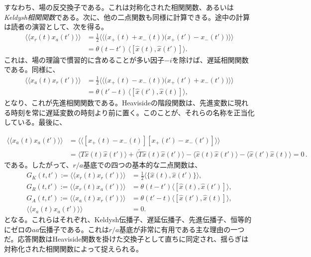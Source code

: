 \documentclass[a4paper,11pt,oneside]{article}
\theoremstyle{definition}
\numberwithin{equation}{section}
\newcommand{\ex}[1]{\langle #1 \rangle}
\newcommand{\expi}[1]{\langle \! \langle #1 \rangle \! \rangle}
\begin{document}
すなわち、場の反交換子である。これは対称化された相関関数、あるいは\textit{Keldysh相関関数}である。次に、他の二点関数も同様に計算できる。途中の計算は読者の演習として、次を得る。
\begin{align}
\langle\!\langle x_r(t)x_a(t')\rangle\!\rangle
&=
\frac12
\langle\!\langle
\bigl(x_+(t)+x_-(t)\bigr)
\bigl(x_+(t')-x_-(t')\bigr)
\rangle\!\rangle
\nonumber\\
&=
\theta(t-t')\,\langle [\hat x(t),\hat x(t')]\rangle .
\end{align}
これは、場の理論で慣習的に含めることが多い因子$-i$を除けば、遅延相関関数である。同様に、
\begin{align}
\langle\!\langle x_a(t)x_r(t')\rangle\!\rangle
&=
\frac12
\langle\!\langle
\bigl(x_+(t)-x_-(t)\bigr)
\bigl(x_+(t')+x_-(t')\bigr)
\rangle\!\rangle
\nonumber\\
&=
\theta(t'-t)\,\langle [\hat x(t'),\hat x(t)]\rangle ,
\end{align}
となり、これが先進相関関数である。Heavisideの階段関数は、先進変数に現れる時刻を常に遅延変数の時刻より前に置く。このことが、それらの名称を正当化している。最後に、









\begin{align}
    \expi{x_{a}(t)x_{a}(t')}&= \expi{\left[ x_{+}(t)-x_{-}(t) \right] \left[ x_{+}(t')-x_{-}(t') \right]}\\
    &=\ex{T \hat x(t)\hat x(t')}+\ex{\widetilde T \hat x(t)\hat x(t')}-\ex{  \hat x(t)\hat x(t')}-\ex{  \hat x(t')\hat x(t)}=0\,.
\end{align}
である。したがって、$r/a$基底での四つの基本的な二点関数は、
\begin{align}
G_K(t,t') := \langle\!\langle x_r(t)x_r(t')\rangle\!\rangle
&= \frac12\langle \{\hat x(t),\hat x(t')\}\rangle ,
\\
G_R(t,t') := \langle\!\langle x_r(t)x_a(t')\rangle\!\rangle
&= \theta(t-t')\langle [\hat x(t),\hat x(t')]\rangle ,
\\
G_A(t,t') := \langle\!\langle x_a(t)x_r(t')\rangle\!\rangle
&= \theta(t'-t)\langle [\hat x(t'),\hat x(t)]\rangle ,
\\
\langle\!\langle x_a(t)x_a(t')\rangle\!\rangle &=0 .
\end{align}
となる。これらはそれぞれ、Keldysh伝播子、遅延伝播子、先進伝播子、恒等的にゼロの$aa$伝播子である。これは$r/a$基底が非常に有用である主な理由の一つだ。応答関数はHeaviside関数を掛けた交換子として直ちに同定され、揺らぎは対称化された相関関数によって捉えられる。
\end{document}
